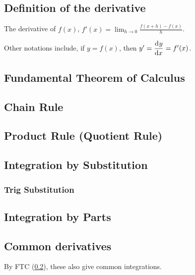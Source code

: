 \documentclass[a4paper,11pt]{article}
\begin{document}

    \subsection{Definition of the derivative}

    The derivative of $f(x)$,
    $\displaystyle f'(x) = \lim_{h \to 0} \frac{f(x + h) - f(x)}{h}$.

    Other notations include, if $y = f(x)$, then
    $y' = \dod yx = f'(x)$.

    \subsection{Fundamental Theorem of Calculus} \label{sec:calc_FTC}

    \subsection{Chain Rule} \label{sec:calc_chain}

    \subsection{Product Rule (Quotient Rule)} \label{sec:calc_product}

    \subsection{Integration by Substitution} \label{sec:calc_substitution}

    \subsubsection{Trig Substitution} \label{sec:calc_trig_substitution}

    \subsection{Integration by Parts}

    \subsection{Common derivatives} \label{calc:common}


    By FTC (\ref{sec:calc_FTC}), these also give common integrations.
\end{document}
